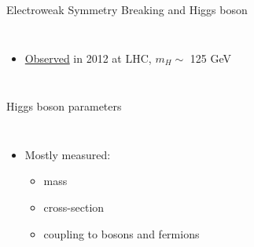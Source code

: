 \begin{frame}{Electroweak Symmetry Breaking and Higgs boson}
\begin{columns}
\begin{itemize}
    \item \underline{Observed} in 2012 at LHC, $m_{H} \sim $ 125 GeV
\end{itemize}
\end{columns}
\end{frame}

\begin{frame}{Higgs boson parameters}

\begin{columns}

\begin{itemize}
    \item Mostly measured:
    \begin{itemize}
        \item \textcolor{HHturquoise_l}{mass}
        \item \textcolor{HHturquoise_m}{cross-section}
        \item \textcolor{HHturquoise_d}{coupling to bosons and fermions}
    \end{itemize}
\end{itemize}



\end{columns}
\end{frame}
